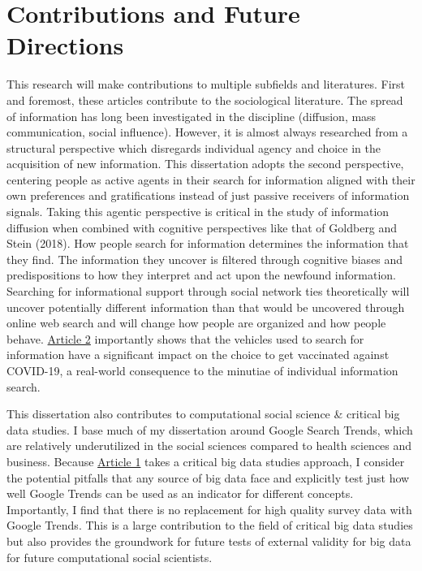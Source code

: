 \section{Contributions and Future Directions}

This research will make contributions to multiple subfields and literatures. 
First and foremost, these articles contribute to the sociological literature.
The spread of information has long been investigated in the discipline (diffusion, mass
communication, social influence). However, it is almost always researched from a structural
perspective which disregards individual agency and choice in the
acquisition of new information. This dissertation adopts the second perspective,
centering people as active agents in their search for information aligned
with their own preferences and gratifications instead of just
passive receivers of information signals.
Taking this agentic perspective is critical in the study of information
diffusion when combined with cognitive perspectives like that of
Goldberg and Stein (2018). How people search for information determines
the information that they find. The information they uncover is filtered
through cognitive biases and predispositions to how they interpret and
act upon the newfound information. Searching for informational support
through social network ties theoretically will uncover potentially
different information than that would be uncovered through online web
search and will change how people are organized and how people behave.
\hyperlink{paper-2}{Article 2} importantly shows that 
the vehicles used to search for information have a significant impact on the choice to get vaccinated against COVID-19, a real-world consequence to the minutiae of individual information search. 

This dissertation also contributes to computational social science \&
critical big data studies. I base much of my dissertation around Google
Search Trends, which are relatively underutilized in the social sciences
compared to health sciences and business. Because \hyperlink{paper-1}{Article 1} 
takes a critical big data studies approach, I consider the potential
pitfalls that any source of big data face \citep{mcfarlandBigDataDanger2015} and explicitly
test just how well Google Trends can be used as an indicator for different concepts. 
Importantly, I find that there is no replacement for high quality survey data with Google Trends. 
This is a large contribution to the field of critical big data studies but also provides
the groundwork for future tests of external validity for big data for future computational
social scientists.

